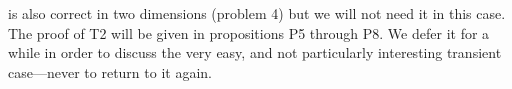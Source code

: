 is also correct in two dimensions (problem 4) but we will not need it in this case. The proof of T2 will be given in propositions P5 through P8. We defer it for a while in order to discuss the very easy, and not particularly interesting transient case—never to return to it again.